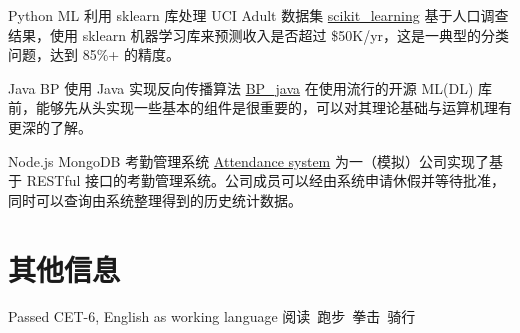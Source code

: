 \documentclass[utf8]{twentysecondcv} %
\begin{document}
\begin{twenty}
	    \twentyitem
        {Python}
		{ML}
        {利用 sklearn 库处理 UCI Adult 数据集}
        {\href{https://github.com/MiaoDX/scikit\_learning/}{scikit\_learning}}
        {}
		{基于人口调查结果，使用 sklearn 机器学习库来预测收入是否超过 \$50K/yr，这是一典型的分类问题，达到 85\%+ 的精度。}
		
        \twentyitem
        {Java}
       	{BP}
        {使用 Java 实现反向传播算法}
        {\href{https://github.com/MiaoDX/bp_java}{BP\_java}}
        {}                
        {在使用流行的开源 ML(\/DL) 库前，能够先从头实现一些基本的组件是很重要的，可以对其理论基础与运算机理有更深的了解。}
		
		\twentyitem
        {Node.js}
        {MongoDB}
        {考勤管理系统}
        {\href{https://github.com/SEAPC2016/attendance}{Attendance system}}
        {}
        {为一（模拟）公司实现了基于 RESTful 接口的考勤管理系统。公司成员可以经由系统申请休假并等待批准，同时可以查询由系统整理得到的历史统计数据。}

\end{twenty}


\section{其他信息}


\begin{twentyshort}
    \twentyitemshort
        {}
        {Passed CET-6, English as working language}
	\twentyitemshort
        {}
        {阅读\ 跑步\ 拳击\ 骑行}
\end{twentyshort}        
\end{document}
